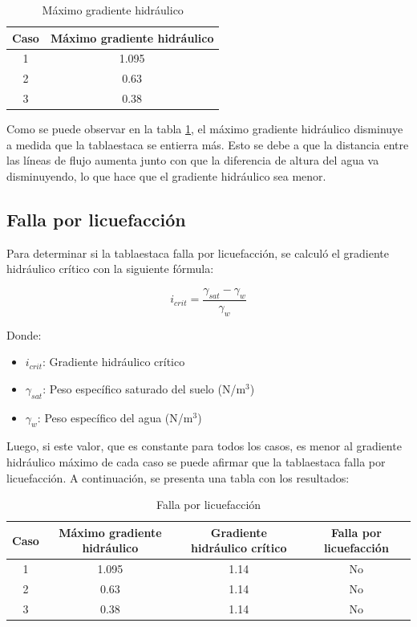 \documentclass{article}
\begin{document}
\begin{table}[h!]
  \centering
  \begin{tabular}{cc}
    \hline
    \textbf{Caso} & \textbf{Máximo gradiente hidráulico} \\
    \hline
    1 & 1.095 \\
    2 & 0.63 \\
    3 & 0.38 \\
    \hline
  \end{tabular}
  \caption{Máximo gradiente hidráulico}
  \label{tab:gradiente}
\end{table}

\newpage

Como se puede observar en la tabla \ref{tab:gradiente}, el máximo gradiente hidráulico disminuye a medida que la tablaestaca se entierra más. Esto se debe a que la distancia entre las líneas de flujo aumenta junto con que la diferencia de altura del agua va disminuyendo, lo que hace que el gradiente hidráulico sea menor. 

\subsection{Falla por licuefacción}

Para determinar si la tablaestaca falla por licuefacción, se calculó el gradiente hidráulico crítico con la siguiente fórmula:

\begin{equation}
  i_{crit} = \frac{\gamma_{sat}-\gamma_w}{\gamma_w} 
\end{equation}

Donde:
\begin{itemize}
    \item $i_{crit}$: Gradiente hidráulico crítico
    \item $\gamma_{sat}$: Peso específico saturado del suelo (N/m$^3$)
    \item $\gamma_w$: Peso específico del agua (N/m$^3$)  
\end{itemize}
Luego, si este valor, que es constante para todos los casos, es menor al gradiente hidráulico máximo de cada caso se puede afirmar que la tablaestaca falla por licuefacción. A continuación, se presenta una tabla con los resultados:

\begin{table}[h!]
  \centering
  \begin{tabular}{cccc}
    \hline
    \textbf{Caso} & \textbf{Máximo gradiente hidráulico}& \textbf{Gradiente hidráulico crítico} &\textbf{Falla por licuefacción} \\
    \hline
    1 &1.095 & 1.14 &No \\
    2 &0.63  & 1.14 &No \\
    3 &0.38  & 1.14 &No \\
    \hline
  \end{tabular}
  \caption{Falla por licuefacción}
  \label{tab:licuefaccion}
\end{table}
\end{document}
